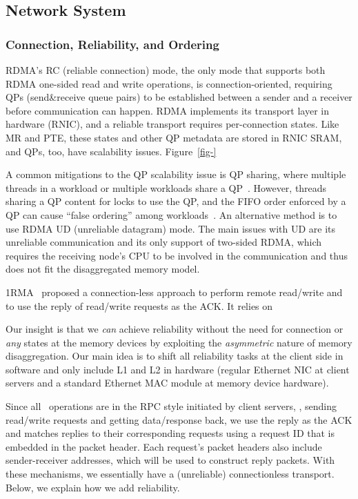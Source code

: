 \subsection{Network System}
\label{sec:network}

\subsubsection{Connection, Reliability, and Ordering}

RDMA's RC (reliable connection) mode, the only mode that supports both RDMA one-sided read and write operations,
is connection-oriented, requiring QPs (send\&receive queue pairs) to be established 
between a sender and a receiver before communication can happen.
RDMA implements its transport layer in hardware (RNIC),
and a reliable transport requires per-connection states.
Like MR and PTE, these states and other QP metadata are stored in RNIC SRAM, 
and QPs, too, have scalability issues.
Figure~\ref{fig-} 

A common mitigations to the QP scalability issue is QP sharing, 
where multiple threads in a workload or multiple workloads share a QP~\cite{FaSST}.
However, threads sharing a QP content for locks to use the QP,
and the FIFO order enforced by a QP can cause ``false ordering'' among workloads~\cite{1RMA}.
An alternative method is to use RDMA UD (unreliable datagram) mode.
The main issues with UD are its unreliable communication and 
its only support of two-sided RDMA, which requires the receiving node's CPU to be involved in the communication and thus does not fit the disaggregated memory model.

1RMA~\cite{1RMA} proposed a connection-less approach to perform remote read/write
and to use the reply of read/write requests as the ACK.
It relies on 

Our insight is that we {\em can} achieve reliability without the need for connection or {\em any} states at the memory devices
by exploiting the {\em asymmetric} nature of memory disaggregation.
Our main idea is to shift all reliability tasks at the client side in software
and only include L1 and L2 in hardware (regular Ethernet NIC at client servers and a standard Ethernet MAC module at memory device hardware).

Since all \sys\ operations are in the RPC style initiated by client servers, \ie, sending read/write requests and getting data/response back,
we use the reply as the ACK and matches replies to their corresponding requests using a request ID that is embedded in the packet header.
Each request's packet headers also include sender-receiver addresses, which will be used to construct reply packets. 
With these mechanisms, we essentially have a (unreliable) connectionless transport.
Below, we explain how we add reliability.

